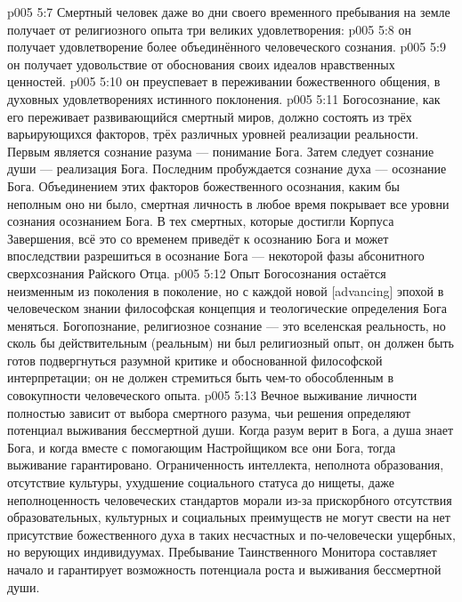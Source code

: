 \vs p005 5:7 \pc Смертный человек даже во дни своего временного пребывания на земле получает от религиозного опыта три великих удовлетворения:
\vs p005 5:8 \bibnobreakspace {} он получает удовлетворение более объединённого человеческого сознания.
\vs p005 5:9 \bibnobreakspace {} он получает удовольствие от обоснования своих идеалов нравственных ценностей.
\vs p005 5:10 \bibnobreakspace {} он преуспевает в переживании божественного общения, в духовных удовлетворениях истинного поклонения.
\vs p005 5:11 \pc Богосознание, как его переживает развивающийся смертный миров, должно состоять из трёх варьирующихся факторов, трёх различных уровней реализации реальности. Первым является сознание разума --- понимание  Бога. Затем следует сознание души --- реализация  Бога. Последним пробуждается сознание духа --- осознание  Бога. Объединением этих факторов божественного осознания, каким бы неполным оно ни было, смертная личность в любое время покрывает все уровни сознания осознанием  Бога. В тех смертных, которые достигли Корпуса Завершения, всё это со временем приведёт к осознанию  Бога и может впоследствии разрешиться в осознание  Бога --- некоторой фазы абсонитного сверхсознания Райского Отца.
\vs p005 5:12 Опыт Богосознания остаётся неизменным из поколения в поколение, но с каждой новой [advancing] эпохой в человеческом знании философская концепция и теологические определения Бога  меняться. Богопознание, религиозное сознание --- это вселенская реальность, но сколь бы действительным (реальным) ни был религиозный опыт, он должен быть готов подвергнуться разумной критике и обоснованной философской интерпретации; он не должен стремиться быть чем\hyp{}то обособленным в совокупности человеческого опыта.
\vs p005 5:13 \pc Вечное выживание личности полностью зависит от выбора смертного разума, чьи решения определяют потенциал выживания бессмертной души. Когда разум верит в Бога, а душа знает Бога, и когда вместе с помогающим Настройщиком все они  Бога, тогда выживание гарантировано. Ограниченность интеллекта, неполнота образования, отсутствие культуры, ухудшение социального статуса до нищеты, даже неполноценность человеческих стандартов морали из\hyp{}за прискорбного отсутствия образовательных, культурных и социальных преимуществ не могут свести на нет присутствие божественного духа в таких несчастных и по\hyp{}человечески ущербных, но верующих индивидуумах. Пребывание Таинственного Монитора составляет начало и гарантирует возможность потенциала роста и выживания бессмертной души.
